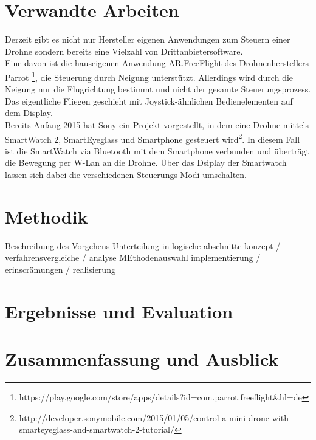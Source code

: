 \documentclass{article}
\begin{document}
\section{Verwandte Arbeiten}
\label{sec:verwandteArbeiten}
Derzeit gibt es nicht nur Hersteller eigenen Anwendungen zum Steuern einer Drohne sondern bereits eine Vielzahl von Drittanbietersoftware. 
\\ Eine davon ist die hauseigenen Anwendung AR.FreeFlight des Drohnenherstellers Parrot \footnote{https://play.google.com/store/apps/details?id=com.parrot.freeflight\&hl=de}, die Steuerung durch Neigung unterstützt. Allerdings wird durch die Neigung nur die Flugrichtung bestimmt und nicht der gesamte Steuerungsprozess. Das eigentliche Fliegen geschieht mit Joystick-ähnlichen Bedienelementen auf dem Display. \\Bereits Anfang 2015 hat Sony ein Projekt vorgestellt, in dem eine Drohne mittels SmartWatch 2, SmartEyeglass und Smartphone gesteuert wird\footnote{http://developer.sonymobile.com/2015/01/05/control-a-mini-drone-with-smarteyeglass-and-smartwatch-2-tutorial/}. In diesem Fall ist die SmartWatch via Bluetooth mit dem Smartphone verbunden und überträgt die Bewegung per W-Lan an die Drohne. Über das Dsiplay der Smartwatch lassen sich dabei die verschiedenen Steuerungs-Modi umschalten.

\section{Methodik}
Beschreibung des Vorgehens
Unterteilung in logische abschnitte
konzept / verfahrensvergleiche / analyse MEthodenauswahl
implementierung / erinscrämungen / realisierung
\section{Ergebnisse und Evaluation}

\section{Zusammenfassung und Ausblick}
{}

\end{document}
